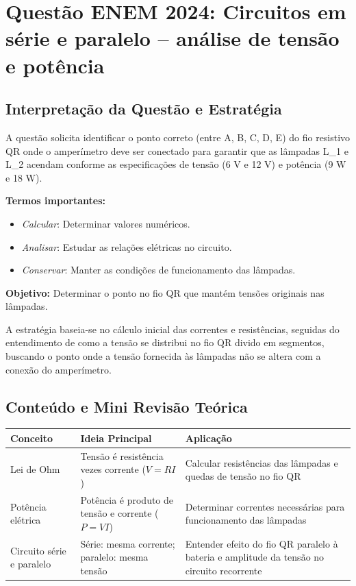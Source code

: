 \documentclass{article}
\begin{document}
\section*{Questão ENEM 2024: Circuitos em série e paralelo -- análise de tensão e potência}

\subsection*{Interpretação da Questão e Estratégia}

A questão solicita identificar o ponto correto (entre A, B, C, D, E) do fio resistivo QR onde o amperímetro deve ser conectado para garantir que as lâmpadas L_1 e L_2 acendam conforme as especificações de tensão (6 V e 12 V) e potência (9 W e 18 W).

\textbf{Termos importantes:}
\begin{itemize}
  \item \textit{Calcular}: Determinar valores numéricos.
  \item \textit{Analisar}: Estudar as relações elétricas no circuito.
  \item \textit{Conservar}: Manter as condições de funcionamento das lâmpadas.
\end{itemize}

\textbf{Objetivo:} Determinar o ponto no fio QR que mantém tensões originais nas lâmpadas.

A estratégia baseia-se no cálculo inicial das correntes e resistências, seguidas do entendimento de como a tensão se distribui no fio QR divido em segmentos, buscando o ponto onde a tensão fornecida às lâmpadas não se altera com a conexão do amperímetro.

\subsection*{Conteúdo e Mini Revisão Teórica}

\begin{tabular}{|p{4cm}|p{6cm}|p{6cm}|}
\hline
\textbf{Conceito} & \textbf{Ideia Principal} & \textbf{Aplicação} \\
\hline
Lei de Ohm & Tensão é resistência vezes corrente ($V=RI$) & Calcular resistências das lâmpadas e quedas de tensão no fio QR \\
\hline
Potência elétrica & Potência é produto de tensão e corrente ($P=VI$) & Determinar correntes necessárias para funcionamento das lâmpadas \\
\hline
Circuito série e paralelo & Série: mesma corrente; paralelo: mesma tensão & Entender efeito do fio QR paralelo à bateria e amplitude da tensão no circuito recorrente \\
\hline
\end{tabular}
\end{document}
